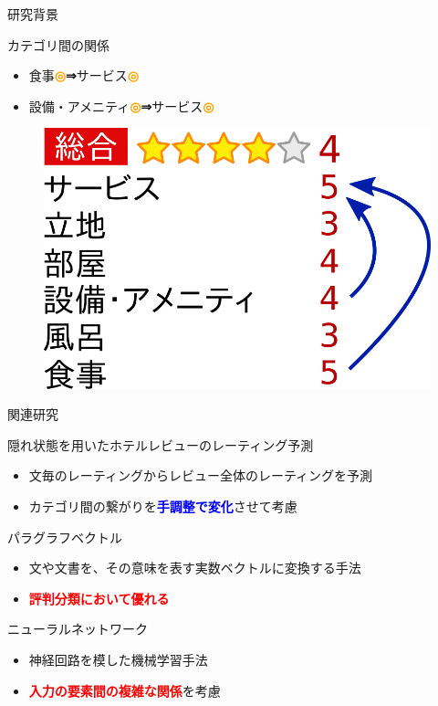 \documentclass[aspectratio=43,unicode,10pt]{beamer}
\newcommand{\fire}[1]{\textcolor{red}{\textbf{#1}}}
\newcommand{\freeze}[1]{\textcolor{blue}{\textbf{#1}}}
\newcommand{\then}{\textcolor{ttiblue}{\textbf{⇒}}\hspace{1ex}}
\newcommand{\up}{\textcolor{orange}{\textbf{◎}}\hspace{1ex}}
\begin{document}
\begin{frame}{研究背景}{}
  \begin{block}{カテゴリ間の関係}
    \begin{itemize}
      \item 食事\up \then サービス\up
      \item 設備・アメニティ\up \then サービス\up
    \end{itemize}
    \begin{figure}
      \includegraphics[width=0.5\linewidth]
                      {fig/relations_among_review_points.png}
    \end{figure}
  \end{block}
\end{frame}

\begin{frame}{関連研究}{}
  \begin{block}{隠れ状態を用いたホテルレビューのレーティング予測}
    \begin{itemize}
      \item 文毎のレーティングからレビュー全体のレーティングを予測
      \item カテゴリ間の繋がりを\freeze{手調整で変化}させて考慮
    \end{itemize}
  \end{block}
  \begin{block}{パラグラフベクトル}{}
    \begin{itemize}
      \item 文や文書を、その意味を表す実数ベクトルに変換する手法
      \item \fire{評判分類において優れる}
    \end{itemize}
  \end{block}
  \begin{block}{ニューラルネットワーク}{}
    \begin{itemize}
      \item 神経回路を模した機械学習手法
      \item \fire{入力の要素間の複雑な関係}を考慮
    \end{itemize}
  \end{block}
\end{frame}
\end{document}
